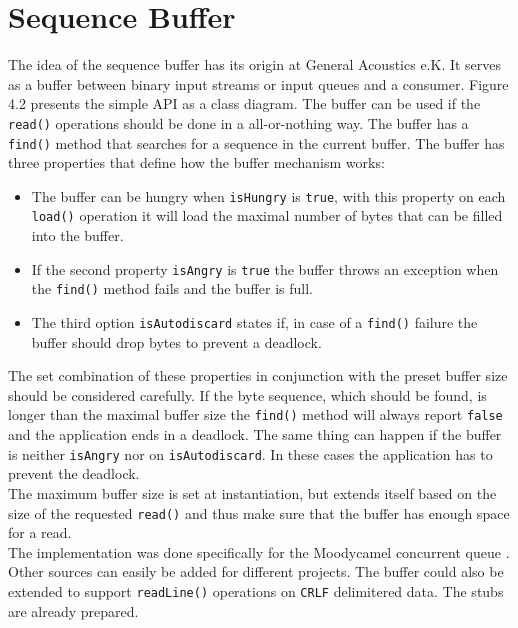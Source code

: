 \section{Sequence Buffer}
The idea of the sequence buffer has its origin at General Acoustics e.K. It serves as a buffer between binary input streams or input queues and a consumer. Figure 4.2 presents the simple API as a class diagram. The buffer can be used if the \texttt{read()} operations should be done in a all-or-nothing way. The buffer has a \texttt{find()} method that searches for a sequence in the current buffer. The buffer has three properties that define how the buffer mechanism works:
\pagebreak
\begin{itemize}
	\item The buffer can be hungry when \texttt{isHungry} is \texttt{true}, with this property on each \texttt{load()} operation it will load the maximal number of bytes that can be filled into the buffer. 
	\item If the second property \texttt{isAngry} is \texttt{true} the buffer throws an exception when the \texttt{find()} method fails and the buffer is full. 
	\item The third option \texttt{isAutodiscard} states if, in case of a \texttt{find()} failure the buffer should drop bytes to prevent a deadlock.
\end{itemize}
The set combination of these properties in conjunction with the preset buffer size should be considered carefully. If the byte sequence, which should be found, is longer than the maximal buffer size the \texttt{find()} method will always report \texttt{false} and the application ends in a deadlock. The same thing can happen if the buffer is neither \texttt{isAngry} nor on \texttt{isAutodiscard}. In these cases the application has to prevent the deadlock.\\
The maximum buffer size is set at instantiation, but extends itself based on the size of the requested \texttt{read()} and thus make sure that the buffer has enough space for a read.\\
The implementation was done specifically for the Moodycamel concurrent queue \cite{moody}. Other sources can easily be added for different projects. The buffer could also be extended to support \texttt{readLine()} operations on \texttt{CRLF} delimitered data. The stubs are already prepared. 
